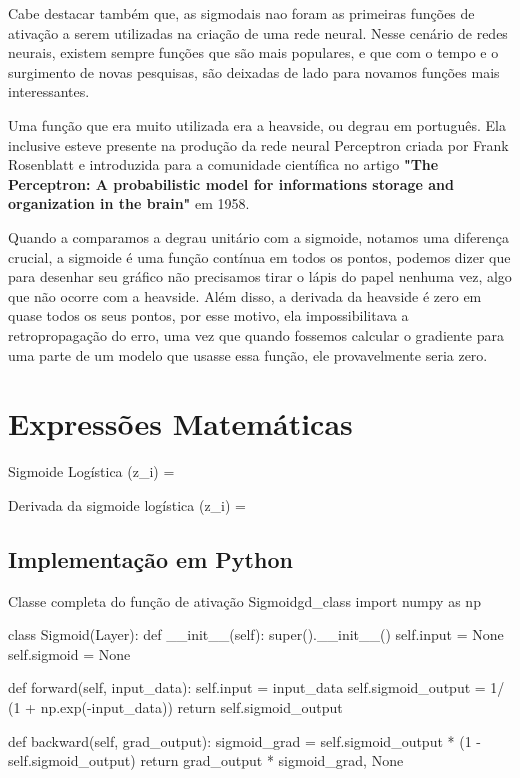 Cabe destacar também que, as sigmodais nao foram as primeiras funções de ativação a serem utilizadas na criação de uma rede neural. Nesse cenário de redes neurais, existem sempre funções que são mais populares, e que com o tempo e o surgimento de novas pesquisas, são deixadas de lado para novamos funções mais interessantes.

Uma função que era muito utilizada era a heavside, ou degrau em português. Ela inclusive esteve presente na produção da rede neural Perceptron criada por Frank Rosenblatt e introduzida para a comunidade científica no artigo \textbf{"The Perceptron: A probabilistic model for informations storage and organization in the brain"} em 1958.

Quando a comparamos a degrau unitário com a sigmoide, notamos uma diferença crucial, a sigmoide é uma função contínua em todos os pontos, podemos dizer que para desenhar seu gráfico não precisamos tirar o lápis do papel nenhuma vez, algo que não ocorre com a heavside. Além disso, a derivada da heavside é zero em quase todos os seus pontos, por esse motivo, ela impossibilitava a retropropagação do erro, uma vez que quando fossemos calcular o gradiente para uma parte de um modelo que usasse essa função, ele provavelmente seria zero.

\section{Expressões Matemáticas}

\begin{equacaodestaque}{Sigmoide Logística}
    \sigma(z_i) = 
    \label{eq:sigmoide}
\end{equacaodestaque}

\begin{equacaodestaque}{Derivada da sigmoide logística}
    \sigma(z_i) = 
    \label{eq:sigmoide-derivada}
\end{equacaodestaque}

\subsection{Implementação em Python}

\begin{codelisting}{Classe completa do função de ativação Sigmoid}{gd_class}
import numpy as np

class Sigmoid(Layer):
    def __init__(self):
        super().__init__()
        self.input = None
        self.sigmoid = None

    def forward(self, input_data):
        self.input = input_data
        self.sigmoid_output = 1/ (1 + np.exp(-input_data))
        return self.sigmoid_output

    def backward(self, grad_output):
        sigmoid_grad = self.sigmoid_output * (1 - self.sigmoid_output)
        return grad_output * sigmoid_grad, None
\end{codelisting}

